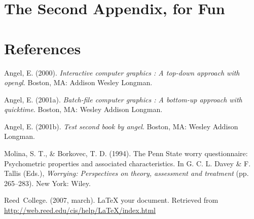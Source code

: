 \documentclass [11pt, proquest] {uwthesis}[2015/03/03]
\begin{document}
\chapter{The Second Appendix, for
Fun}\label{the-second-appendix-for-fun}

\backmatter

\chapter*{References}\label{references}


\noindent

\setlength{\parindent}{-0.20in} \setlength{\leftskip}{0.20in}
\setlength{\parskip}{8pt}

\hypertarget{refs}{}
\hypertarget{ref-angel2000}{}
Angel, E. (2000). \emph{Interactive computer graphics : A top-down
approach with opengl}. Boston, MA: Addison Wesley Longman.

\hypertarget{ref-angel2001}{}
Angel, E. (2001a). \emph{Batch-file computer graphics : A bottom-up
approach with quicktime}. Boston, MA: Wesley Addison Longman.

\hypertarget{ref-angel2002a}{}
Angel, E. (2001b). \emph{Test second book by angel}. Boston, MA: Wesley
Addison Longman.

\hypertarget{ref-Molina1994}{}
Molina, S. T., \& Borkovec, T. D. (1994). The Penn State worry
questionnaire: Psychometric properties and associated characteristics.
In G. C. L. Davey \& F. Tallis (Eds.), \emph{Worrying: Perspectives on
theory, assessment and treatment} (pp. 265--283). New York: Wiley.

\hypertarget{ref-reedweb2007}{}
Reed~College. (2007, march). LaTeX your document. Retrieved from
\url{http://web.reed.edu/cis/help/LaTeX/index.html}
\end{document}
